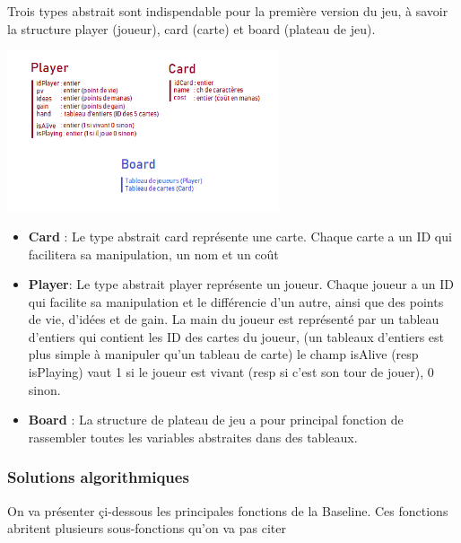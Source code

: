 \documentclass[a4paper]{article}
\begin{document}
Trois types abstrait sont indispendable pour la première version du jeu, à savoir la structure player (joueur), card (carte) et board (plateau de jeu).\\
\begin{center}
\includegraphics[width=0.6\textwidth]{Baseline_1}\\[1cm]
\end{center}
\noindent
\begin{itemize}


\item \textbf{Card} :
Le type abstrait card représente une carte. Chaque carte a un ID qui facilitera sa manipulation, un nom et un coût

\item \textbf{Player}: 
Le type abstrait player représente un joueur. Chaque joueur a un ID qui facilite sa manipulation et le différencie d'un autre, ainsi que des points de vie, d'idées et de gain. La main du joueur est représenté par un tableau d'entiers qui contient les ID des cartes du joueur, (un tableaux d'entiers est plus simple à manipuler qu'un tableau de carte) le champ isAlive (resp isPlaying) vaut 1 si le joueur est vivant (resp si c'est son tour de jouer), 0 sinon.

\item \textbf{Board} :
La structure de plateau de jeu a pour principal fonction de rassembler toutes les variables abstraites dans des tableaux. 

\end{itemize}

\subsubsection{Solutions algorithmiques}

On va présenter çi-dessous les principales fonctions de la Baseline. Ces fonctions abritent plusieurs sous-fonctions qu'on va pas citer 
\end{document}
